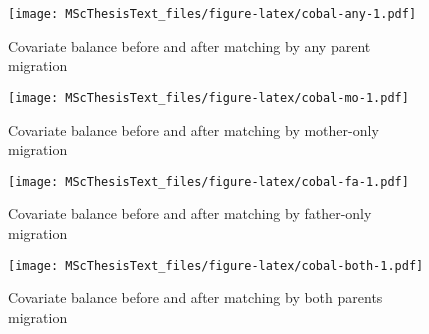 \documentclass[
  man,floatsintext]{apa7}
\begin{document}
\newpage











\begin{figure}
\centering
\texttt{[image: MScThesisText\_files/figure-latex/cobal-any-1.pdf]}
\caption{\label{fig:cobal-any}Covariate balance before and after matching by any parent migration}
\end{figure}

\newpage

\begin{figure}
\centering
\texttt{[image: MScThesisText\_files/figure-latex/cobal-mo-1.pdf]}
\caption{\label{fig:cobal-mo}Covariate balance before and after matching by mother-only migration}
\end{figure}

\newpage

\begin{figure}
\centering
\texttt{[image: MScThesisText\_files/figure-latex/cobal-fa-1.pdf]}
\caption{\label{fig:cobal-fa}Covariate balance before and after matching by father-only migration}
\end{figure}

\newpage

\begin{figure}
\centering
\texttt{[image: MScThesisText\_files/figure-latex/cobal-both-1.pdf]}
\caption{\label{fig:cobal-both}Covariate balance before and after matching by both parents migration}
\end{figure}

\newpage
\end{document}

